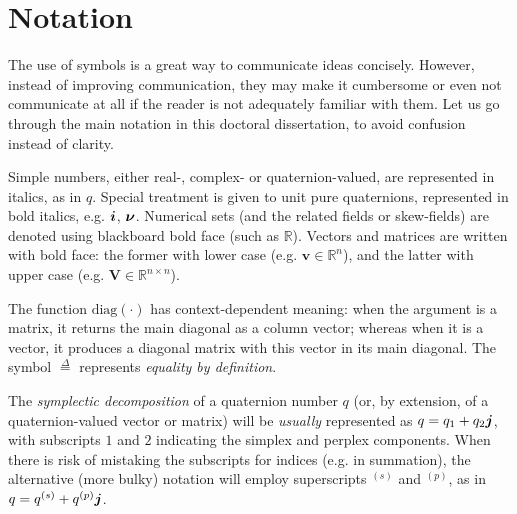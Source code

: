 \section{Notation}
The use of symbols is a great way to communicate ideas concisely. However, instead of improving communication, they may make it cumbersome or even not communicate at all if the reader is not adequately familiar with them. Let us go through the main notation in this doctoral dissertation, to avoid confusion instead of clarity.

Simple numbers, either real-, complex- or quaternion-valued, are represented in italics, as in $q$. Special treatment is given to unit pure quaternions, represented in bold italics, e.g. $\boldsymbol{i}$, $\boldsymbol{\nu}$. Numerical sets (and the related fields or skew-fields) are denoted using blackboard bold face (such as $\mathbb{R}$). Vectors and matrices are written with bold face: the former with lower case (e.g. $\mathbf{v} \in \mathbb{R}^{n}$), and the latter with upper case (e.g. $\mathbf{V} \in \mathbb{R}^{n \times n}$).

The function $\mathrm{diag}(\cdot)$ has context-dependent meaning: when the argument is a matrix, it returns the main diagonal as a column vector; whereas when it is a vector, it produces a diagonal matrix with this vector in its main diagonal. The symbol $\overset{\Delta}{=}$ represents \textit{equality by definition}.

The \textit{symplectic decomposition} of a quaternion number $q$ (or, by extension, of a quaternion-valued vector or matrix) will be \textit{usually} represented as $q = q_1 + q_2 \boldsymbol{j}$, with subscripts $1$ and $2$ indicating the simplex and perplex components. When there is risk of mistaking the subscripts for indices (e.g. in summation), the alternative (more bulky) notation will employ superscripts $^{(s)}$ and $^{(p)}$, as in $q = q^{(s)} + q^{(p)} \boldsymbol{j}$.
